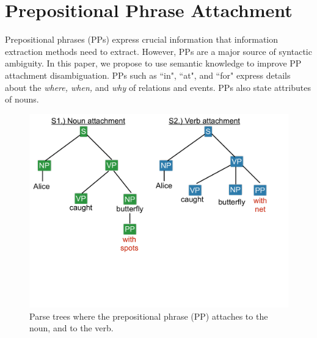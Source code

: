 \section{Prepositional Phrase Attachment}\label{ppa}
Prepositional phrases (PPs)   express crucial information that  information extraction  methods need to extract.
 However, PPs are a major source of  syntactic  ambiguity. In this paper, we propose to use semantic knowledge to  improve PP attachment disambiguation. 
 PPs such as  ``in", ``at", and ``for" express details about the  \textit{where, when,} and \textit{why}  of  relations and events. PPs   also state  attributes of nouns. 

\begin{figure}[t]

\centering

\includegraphics[width=1\columnwidth] {trees2.pdf}
\vspace*{-2.6cm}
\caption{Parse trees where the prepositional phrase (PP) attaches to the noun, and to the verb.}

\label{fig:deptrees}

\end{figure}




